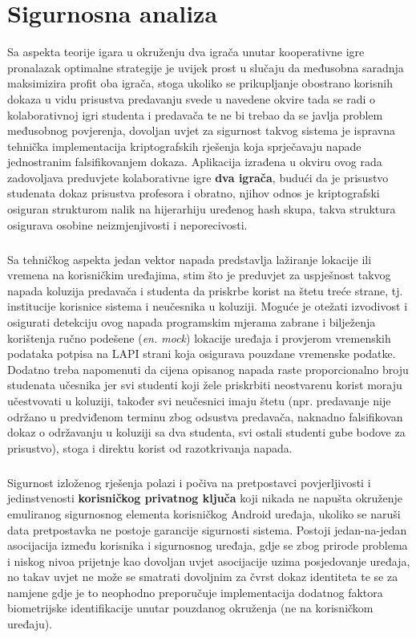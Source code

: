 \chapter{Sigurnosna analiza}
Sa aspekta teorije igara\cite{davis2012game} u okruženju dva igrača unutar kooperativne igre\cite{nash1953two} pronalazak optimalne strategije je uvijek prost u slučaju da međusobna saradnja maksimizira profit oba igrača, stoga ukoliko se prikupljanje obostrano korisnih dokaza u vidu prisustva predavanju svede u navedene okvire tada se radi o kolaborativnoj igri studenta i predavača te ne bi trebao da se javlja problem međusobnog povjerenja, dovoljan uvjet za sigurnost takvog sistema je ispravna tehnička implementacija kriptografskih rješenja koja sprječavaju napade jednostranim falsifikovanjem dokaza. Aplikacija izrađena u okviru ovog rada zadovoljava preduvjete kolaborativne igre \textbf{dva igrača}, budući da je prisustvo studenata dokaz prisustva profesora i obratno, njihov odnos je kriptografski osiguran strukturom nalik na hijerarhiju uređenog hash skupa, takva struktura osigurava osobine neizmjenjivosti i neporecivosti.

\paragraph*{}
Sa tehničkog aspekta jedan vektor napada predstavlja lažiranje lokacije ili vremena na korisničkim uređajima, stim što je preduvjet za uspješnost takvog napada koluzija predavača i studenta da priskrbe korist na štetu treće strane, tj. institucije korisnice sistema i neučesnika u koluziji. Moguće je otežati izvodivost i osigurati detekciju ovog napada programskim mjerama zabrane i bilježenja korištenja ručno podešene (\textit{en. mock}) lokacije uređaja i provjerom vremenskih podataka potpisa na LAPI strani koja osigurava pouzdane vremenske podatke. Dodatno treba napomenuti da cijena opisanog napada raste proporcionalno broju studenata učesnika jer svi studenti koji žele priskrbiti neostvarenu korist moraju učestvovati u koluziji, također svi neučesnici imaju štetu (npr. predavanje nije održano u predviđenom terminu zbog odsustva predavača, naknadno falsifikovan dokaz o održavanju u koluziji sa dva studenta, svi ostali studenti gube bodove za prisustvo), stoga i direktu korist od razotkrivanja napada.

\paragraph*{}
Sigurnost izloženog rješenja polazi i počiva na pretpostavci povjerljivosti i jedinstvenosti \textbf{korisničkog privatnog ključa} koji nikada ne napušta okruženje emuliranog sigurnosnog elementa korisničkog Android uređaja, ukoliko se naruši data pretpostavka ne postoje garancije sigurnosti sistema. Postoji jedan-na-jedan asocijacija između korisnika i sigurnosnog uređaja, gdje se zbog prirode problema i niskog nivoa prijetnje kao dovoljan uvjet asocijacije uzima posjedovanje uređaja, no takav uvjet ne može se smatrati dovoljnim za čvrst dokaz identiteta te se za namjene gdje je to neophodno preporučuje implementacija dodatnog faktora biometrijske identifikacije unutar pouzdanog okruženja (ne na korisničkom uređaju).